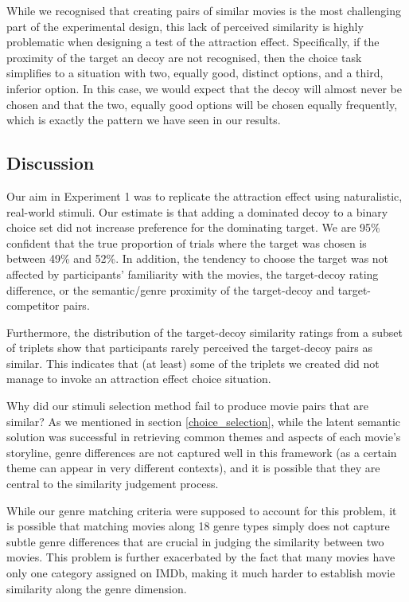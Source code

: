 \documentclass[11pt,a4paper]{article}
\begin{document}
While we recognised that creating pairs of similar movies is the most challenging part of the experimental design, this lack of perceived similarity is highly problematic when designing a test of the attraction effect. Specifically, if the proximity of the target an decoy are not recognised, then the choice task simplifies to a situation with two, equally good, distinct options, and a third, inferior option. In this case, we would expect that the decoy will almost never be chosen and that the two, equally good options will be chosen equally frequently, which is exactly the pattern we have seen in our results. 




\subsection{Discussion}

Our aim in Experiment 1 was to replicate the attraction effect using naturalistic, real-world stimuli. Our estimate is that adding a dominated decoy to a binary choice set did not increase preference for the dominating target. We are 95\% confident that the true proportion of trials where the target was chosen is between 49\% and 52\%. In addition, the tendency to choose the target was not affected by participants' familiarity with the movies, the target-decoy rating difference, or the semantic/genre proximity of the target-decoy and target-competitor pairs.

Furthermore, the distribution of the target-decoy similarity ratings from a subset of triplets show that participants rarely perceived the target-decoy pairs as similar. This indicates that (at least) some of the triplets we created did not manage to invoke an attraction effect choice situation.


Why did our stimuli selection method fail to produce movie pairs that are similar? As we mentioned in section \ref{choice_selection}, while the latent semantic solution was successful in retrieving common themes and aspects of each movie's storyline, genre differences are not captured well in this framework (as a certain theme can appear in very different contexts), and it is possible that they are central to the similarity judgement process. 

While our genre matching criteria were supposed to account for this problem, it is possible that matching movies along 18 genre types simply does not capture subtle genre differences that are crucial in judging the similarity between two movies. This problem is further exacerbated by the fact that many movies have only one category assigned on IMDb, making it much harder to establish movie similarity along the genre dimension.
\end{document}

